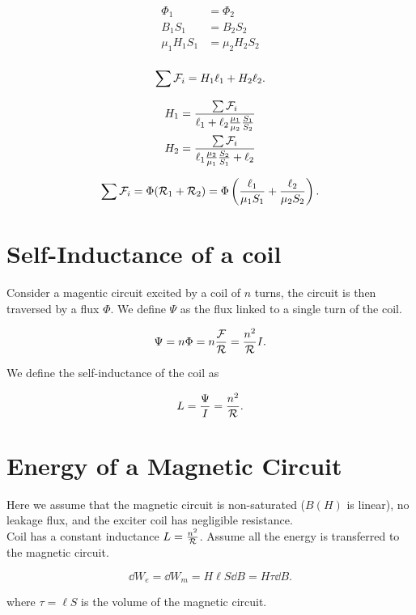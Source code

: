 \documentclass{report}
\begin{document}
\begin{align*}
	\Phi_1        & = \Phi_2        \\
	B_1 S_1       & = B_2 S_2       \\
	\mu_1 H_1 S_1 & = \mu_2 H_2 S_2 \\
\end{align*}

\[
	\sum \mathcal F_i = H_1 \ell_1 + H_2 \ell_2
	.\]

\begin{align*}
	H_1 & = \frac{\sum \mathcal F_i}{\ell_1 + \ell_2 \frac{\mu_1}{\mu_2} \frac{S_1}{S_2}} \\
	H_2 & = \frac{\sum \mathcal F_i}{\ell_1 \frac{\mu_2}{\mu_1} \frac{S_2}{S_1} + \ell_2}
\end{align*}

\[
	\sum \mathcal F_i = \Phi(\mathcal{R}_1 + \mathcal{R}_2) = \Phi \left( \frac{\ell_1}{\mu_1 S_1} + \frac{\ell_2}{\mu_2 S_2} \right)
	.\]

\section{Self-Inductance of a coil}

Consider a magentic circuit excited by a coil of $n$ turns, the circuit is then traversed by a flux $\Phi$. We define $\Psi$ as the flux linked to a single turn of the coil.

\[
	\Psi = n \Phi = n\frac{\mathcal F}{\mathcal{R}} = \frac{n^2}{\mathcal{R}} I
	.\]

We define the self-inductance of the coil as

\[
	L = \frac{\Psi}{I} = \frac{n^2}{\mathcal{R}}
	.\]


\section{Energy of a Magnetic Circuit}

Here we assume that the magnetic circuit is non-saturated ($B(H)$ is linear), no leakage flux, and the exciter coil has negligible resistance.\\

Coil has a constant inductance $L=\frac{n^2}{\mathcal{R}}$. Assume all the energy is transferred to the magnetic circuit.

\[
	\dd{W_e} = \dd{W_m} = H \ell S \dd{B} = H \tau \dd{B}
	.\]

where $\tau = \ell S$ is the volume of the magnetic circuit.
\end{document}
